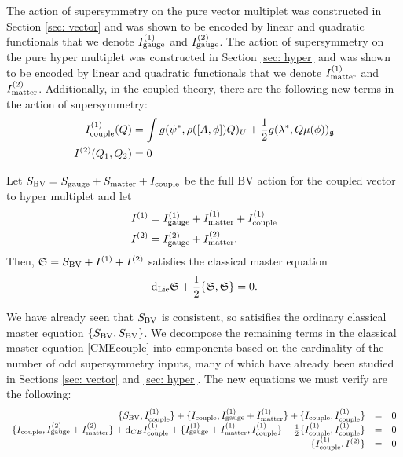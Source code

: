 \documentclass[10pt, oneside]{article}
\begin{document}
The action of supersymmetry on the pure vector multiplet was constructed in Section \ref{sec: vector} and was shown to be encoded by linear and quadratic functionals that we denote $I^{(1)}_{\rm gauge}$ and $I^{(2)}_{\rm gauge}$. 
The action of supersymmetry on the pure hyper multiplet was constructed in Section \ref{sec: hyper} and was shown to be encoded by linear and quadratic functionals that we denote $I^{(1)}_{\rm matter}$ and $I^{(2)}_{\rm matter}$. 
Additionally, in the coupled theory, there are the following new terms in the action of supersymmetry:
\begin{align*}
I^{(1)}_{\rm couple} (Q) & = \int g (\psi^*, \rho([A, \phi]) Q)_U + \frac{1}{2} g (\lambda^*, Q \mu(\phi))_\mathfrak g \\
I^{(2)} (Q_1 , Q_2) & = 0 
\end{align*}

\begin{thm}
Let $S_{\rm BV} = S_{\rm gauge} + S_{\rm matter} + I_{\rm couple}$ be the full BV action for the coupled vector to hyper multiplet and let
\begin{align*}
I^{(1)} & = I^{(1)}_{\rm gauge} + I^{(1)}_{\rm matter} + I^{(1)}_{\rm couple} \\
I^{(2)} & = I^{(2)}_{\rm gauge} + I^{(2)}_{\rm matter} .
\end{align*}
Then, $\mathfrak S = S_{\rm BV} + I^{(1)} + I^{(2)}$ satisfies the classical master equation
\begin{equation}\label{CMEcouple}
{\rm d}_{\rm Lie} \mathfrak S + \frac{1}{2} \{\mathfrak S, \mathfrak S\} = 0 .
\end{equation}
\end{thm}

We have already seen that $S_{\rm BV}$ is consistent, so satisifies the ordinary classical master equation $\{S_{\rm BV}, S_{\rm BV}\}$. 
We decompose the remaining terms in the classical master equation \ref{CMEcouple} into components based on the cardinality of the number of odd supersymmetry inputs, many of which have already been studied in Sections \ref{sec: vector} and \ref{sec: hyper}. 
The new equations we must verify are the following:
\begin{equation}\label{CMEcouple}
\begin{array}{rrrrrr}
\{S_{\rm BV} , I^{(1)}_{\rm couple}\} + \{I_{\rm couple}, I^{(1)}_{\rm gauge} + I^{(1)}_{\rm matter}\} + \{I_{\rm couple}, I^{(1)}_{\rm couple}\} & = & 0 \\ 
\{I_{\rm couple}, I^{(2)}_{\rm gauge} + I^{(2)}_{\rm matter}\} + {\rm d}_{CE} I^{(1)}_{\rm couple} + \{I^{(1)}_{\rm gauge} + I^{(1)}_{\rm matter}, I^{(1)}_{\rm couple}\} + \frac{1}{2} \{I_{\rm couple}^{(1)}, I_{\rm couple}^{(1)}\} & = & 0 \\
\{I_{\rm couple}^{(1)}, I^{(2)}\} & =& 0 \\
\end{array}
\end{equation}
\end{document}
